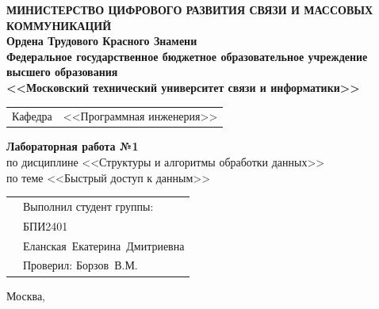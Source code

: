 \thispagestyle{empty}

\begin{center}
	\textbf{МИНИСТЕРСТВО ЦИФРОВОГО РАЗВИТИЯ СВЯЗИ И МАССОВЫХ КОММУНИКАЦИЙ} \\
	\textbf{Ордена Трудового Красного Знамени \\
		Федеральное государственное бюджетное образовательное учреждение высшего образования \\
		<<Московский технический университет связи и информатики>>}
\end{center}

\vspace{0.3em}

\begin{center}
	\begin{tabularx}{0.55\textwidth}{p{1.2cm}X}
		Кафедра & \quad <<Программная инженерия>> \\%
	\end{tabularx}
\end{center}

\vspace{12em}

\begin{center}
	\Large
	\textbf{Лабораторная работа №1} \\
	\large
	по дисциплине <<Структуры и алгоритмы обработки данных>> \\
	по теме <<Быстрый доступ к данным>>
\end{center}

\vspace{3em}


\renewcommand{\arraystretch}{1.1}
\begin{tabularx}{\textwidth}{p{8cm}p{7cm}}
	& Выполнил студент группы: \\
 	& БПИ2401 \\
 	& Еланская~Екатерина~Дмитриевна\\
 	& Проверил: Борзов~В.М.\\
\end{tabularx}

\vspace{8em}

\begin{center}
	Москва,~\the\year
\end{center}
\clearpage

